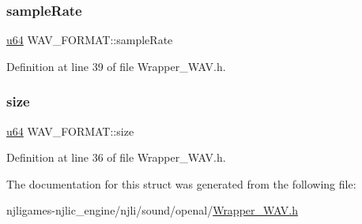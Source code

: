 \mbox{\label{struct_w_a_v___f_o_r_m_a_t_a5dc7fe93937eb8425a426c9850cbf8e7}} 
\subsubsection{\texorpdfstring{sample\+Rate}{sampleRate}}
{\footnotesize\ttfamily \mbox{\hyperlink{_util_8h_ad758b7a5c3f18ed79d2fcd23d9f16357}{u64}} W\+A\+V\+\_\+\+F\+O\+R\+M\+A\+T\+::sample\+Rate}



Definition at line 39 of file Wrapper\+\_\+\+W\+A\+V.\+h.

\mbox{\label{struct_w_a_v___f_o_r_m_a_t_aa74155b8a7752c37742f87257f00c8d2}} 
\subsubsection{\texorpdfstring{size}{size}}
{\footnotesize\ttfamily \mbox{\hyperlink{_util_8h_ad758b7a5c3f18ed79d2fcd23d9f16357}{u64}} W\+A\+V\+\_\+\+F\+O\+R\+M\+A\+T\+::size}



Definition at line 36 of file Wrapper\+\_\+\+W\+A\+V.\+h.



The documentation for this struct was generated from the following file\+:\begin{DoxyCompactItemize}
\item 
njligames-\/njlic\+\_\+engine/njli/sound/openal/\mbox{\hyperlink{_wrapper___w_a_v_8h}{Wrapper\+\_\+\+W\+A\+V.\+h}}\end{DoxyCompactItemize}
